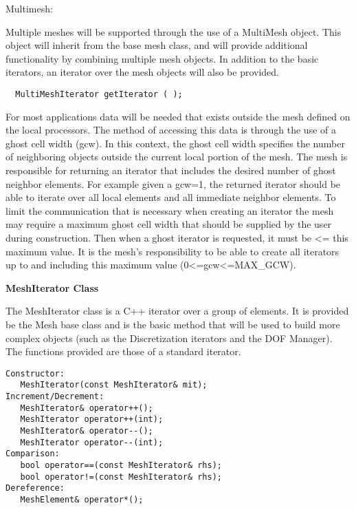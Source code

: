 \documentclass[10pt]{article}
\newenvironment{codelisting}
{\begin{list}{}{\setlength{\leftmargin}{2em}}\item\scriptsize\normalsize}
{\end{list}}
\begin{document}
\vspace{3 mm}\linebreak
\noindent Multimesh:
\par\par
Multiple meshes will be supported through the use of a MultiMesh object.  This object will inherit from the base mesh class, and will provide additional functionality by combining multiple mesh objects.  In addition to the basic iterators, an iterator over the mesh objects will also be provided.
\begin{codelisting}
\begin{verbatim}
  MultiMeshIterator getIterator ( );
\end{verbatim}
\end{codelisting}

\vspace{3 mm}\linebreak
For most applications data will be needed that exists outside the mesh defined on the local processors.  The method of accessing this data is through the use of a ghost cell width (gcw).  In this context, the ghost cell width specifies the number of neighboring objects outside the current local portion of the mesh.  The mesh is responsible for returning an iterator that includes the desired number of ghost neighbor elements.  For example given a gcw=1, the returned iterator should be able to iterate over all local elements and all immediate neighbor elements.  To limit the communication that is necessary when creating an iterator the mesh may require a maximum ghost cell width that should be supplied by the user during construction.  Then when a ghost iterator is requested, it must be <= this maximum value.  It is the mesh's responsibility to be able to create all iterators up to and including this maximum value (0<=gcw<=MAX_GCW).  


\vspace{6 mm}\noindent\textbf{MeshIterator Class}

The MeshIterator class is a C++ iterator over a group of elements.  It is provided be the Mesh base class and is the basic method that will be used to build more complex objects (such as the Discretization iterators and the DOF Manager).  The functions provided are those of a standard iterator.
\begin{codelisting}
\begin{verbatim}
Constructor:
   MeshIterator(const MeshIterator& mit);
Increment/Decrement:
   MeshIterator& operator++();
   MeshIterator operator++(int);
   MeshIterator& operator--();
   MeshIterator operator--(int);
Comparison:
   bool operator==(const MeshIterator& rhs);
   bool operator!=(const MeshIterator& rhs);
Dereference:
   MeshElement& operator*();
\end{verbatim}
\end{codelisting}
\end{document}
